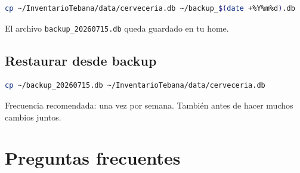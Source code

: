 \documentclass[11pt,a4paper]{report}
\begin{document}
\begin{lstlisting}[language=bash, basicstyle=\small\ttfamily, frame=single, backgroundcolor=\color{black!3}]
cp ~/InventarioTebana/data/cerveceria.db ~/backup_$(date +%Y%m%d).db
\end{lstlisting}

El archivo \texttt{backup\_20260715.db} queda guardado en tu home.

\section{Restaurar desde backup}

\begin{lstlisting}[language=bash, basicstyle=\small\ttfamily, frame=single, backgroundcolor=\color{black!3}]
cp ~/backup_20260715.db ~/InventarioTebana/data/cerveceria.db
\end{lstlisting}

\begin{tipbox}
Frecuencia recomendada: una vez por semana. También antes de hacer muchos cambios juntos.
\end{tipbox}

\chapter{Preguntas frecuentes}
\end{document}
